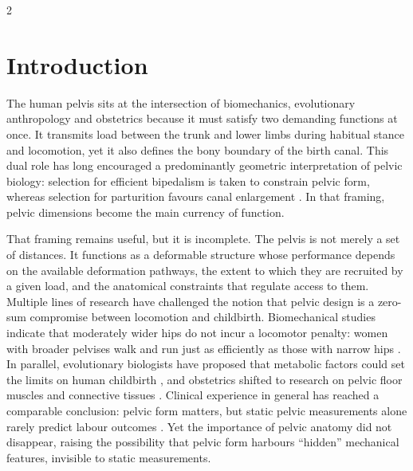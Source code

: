 \documentclass[openacc]{rsproca_new}
\begin{document}
\begin{multicols}{2}

\section{Introduction}

The human pelvis sits at the intersection of biomechanics, evolutionary anthropology and obstetrics because it must satisfy two demanding functions at once. It transmits load between the trunk and lower limbs during habitual stance and locomotion, yet it also defines the bony boundary of the birth canal. This dual role has long encouraged a predominantly geometric interpretation of pelvic biology: selection for efficient bipedalism is taken to constrain pelvic form, whereas selection for parturition favours canal enlargement \cite{RosenbergTrevathan2002,Trevathan2015,Grunstra2023}. In that framing, pelvic dimensions become the main currency of function.

That framing remains useful, but it is incomplete. The pelvis is not merely a set of distances. It functions as a deformable structure whose performance depends on the available deformation pathways, the extent to which they are recruited by a given load, and the anatomical constraints that regulate access to them. Multiple lines of research have challenged the notion that pelvic design is a zero-sum compromise between locomotion and childbirth. Biomechanical studies indicate that moderately wider hips do not incur a locomotor penalty: women with broader pelvises walk and run just as efficiently as those with narrow hips \cite{Warrener2015}. In parallel, evolutionary biologists have proposed that metabolic factors could set the limits on human childbirth \cite{Dunsworth2012}, and obstetrics shifted to research on pelvic floor muscles and connective tissues \cite{Pavlicev2020}. Clinical experience in general has reached a comparable conclusion: pelvic form matters, but static pelvic measurements alone rarely predict labour outcomes \cite{bergella}. Yet the importance of pelvic anatomy did not disappear, raising the possibility that pelvic form harbours “hidden” mechanical features, invisible to static measurements.


\end{multicols}
\end{document}
